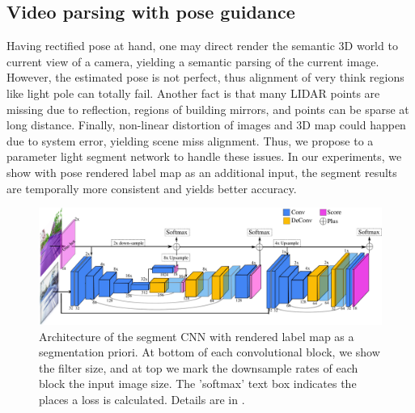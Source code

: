 \subsection{Video parsing with pose guidance}
\label{subsec:parsing}
Having rectified pose at hand, one may direct render the semantic 3D world to current view of a camera, yielding a semantic parsing of the current image. However, the estimated pose is not perfect, thus alignment of very think regions like light pole can totally fail. Another fact is that many LIDAR points are missing due to reflection, \eg regions of building mirrors, and points can be sparse at long distance. Finally, non-linear distortion of images and 3D map could happen due to system error, yielding scene miss alignment. Thus, we propose to a parameter light segment network to handle these issues.
In our experiments, we show with pose rendered label map as an additional input, the segment results are temporally more consistent and yields better accuracy.

\begin{figure}[]
\includegraphics[width=\textwidth]{fig/segCNN.pdf}
\caption{Architecture of the segment CNN with rendered label map as a segmentation priori. At bottom of each convolutional block, we show the filter size, and at top we mark the downsample rates of each block \wrt the input image size. The 'softmax' text box indicates the places a loss is calculated. Details are in .}
\label{fig:segnet}
\end{figure}

